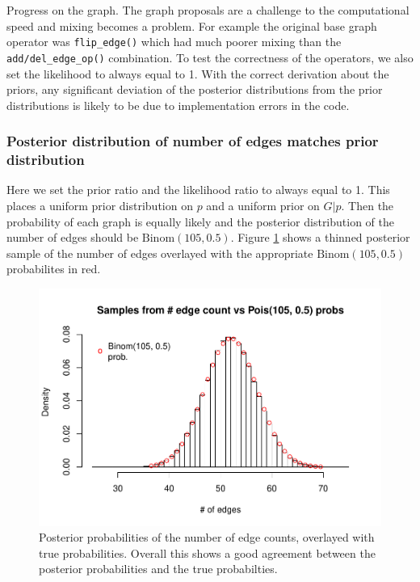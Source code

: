 \documentclass[11pt,a4paper]{article}
\numberwithin{equation}{section}
\begin{document}
Progress on the graph. The graph proposals are a challenge to the
computational speed and mixing becomes a problem. For example the
original base graph operator was \texttt{flip\_edge()} which had much
poorer mixing than the \texttt{add/del\_edge\_op()} combination. To test
the correctness of the operators, we also set the likelihood to always
equal to 1. With the correct derivation about the priors, any
significant deviation of the posterior distributions from the prior
distributions is likely to be due to implementation errors in the code.

\hypertarget{posterior-distribution-of-number-of-edges-matches-prior-distribution}{%
\subsubsection{Posterior distribution of number of edges matches prior
distribution}\label{posterior-distribution-of-number-of-edges-matches-prior-distribution}}

Here we set the prior ratio and the likelihood ratio to always equal to
1. This places a uniform prior distribution on \(p\) and a uniform prior
on \(G|p\). Then the probability of each graph is equally likely and the
posterior distribution of the number of edges should be
\(\text{Binom}(105, 0.5)\). Figure \ref{fig:binom_hist} shows a thinned
posterior sample of the number of edges overlayed with the appropriate
\(\text{Binom}(105, 0.5)\) probabilites in red.

\begin{figure}
\centering
\includegraphics{thesis_draft_files/figure-latex/unnamed-chunk-8-1.pdf}
\caption{\label{fig:binom_hist} Posterior probabilities of the number of
edge counts, overlayed with true probabilities. Overall this shows a
good agreement between the posterior probabilities and the true
probabilties.}
\end{figure}
\end{document}
